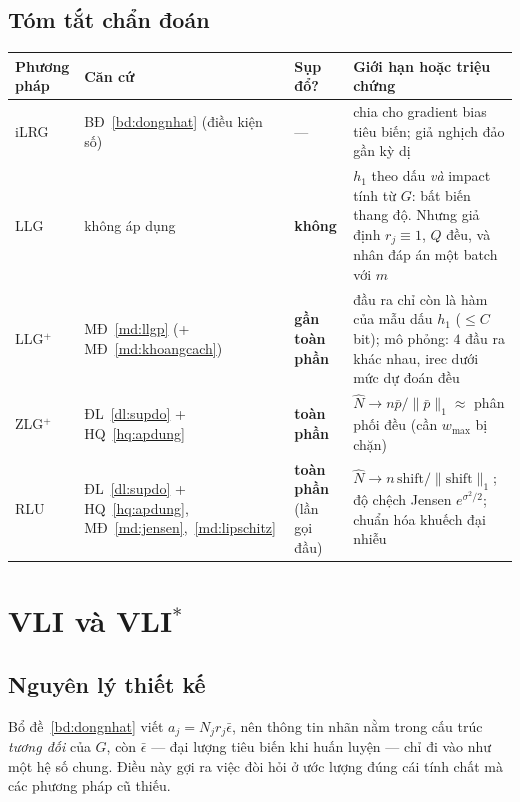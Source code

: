 \documentclass[11pt]{article}
\theoremstyle{remark}
\begin{document}
\subsection{Tóm tắt chẩn đoán}

\begin{center}
\footnotesize
\begin{tabular}{@{}lllp{6.0cm}@{}}
\toprule
Phương pháp & Căn cứ & Sụp đổ? & Giới hạn hoặc triệu chứng \\
\midrule
iLRG & BĐ~\ref{bd:dongnhat} (điều kiện số) & --- &
 chia cho gradient bias tiêu biến; giả nghịch đảo gần kỳ dị \\
LLG & không áp dụng & \textbf{không} &
 $h_1$ theo dấu \emph{và} impact tính từ $G$: bất biến thang độ. Nhưng giả
 định $r_j\equiv1$, $Q$ đều, và nhân đáp án một batch với $m$ \\
LLG$^+$ & MĐ~\ref{md:llgp} (+ MĐ~\ref{md:khoangcach}) & \textbf{gần toàn phần} &
 đầu ra chỉ còn là hàm của mẫu dấu $h_1$ ($\le C$ bit); mô phỏng: $4$ đầu ra
 khác nhau, irec dưới mức dự đoán đều \\
ZLG$^+$ & ĐL~\ref{dl:supdo} + HQ~\ref{hq:apdung} & \textbf{toàn phần} &
 $\widehat N \to n\bar p/\|\bar p\|_1 \approx$ phân phối đều (cần $w_{\max}$ bị chặn) \\
RLU & ĐL~\ref{dl:supdo} + HQ~\ref{hq:apdung}, MĐ~\ref{md:jensen},~\ref{md:lipschitz} & \textbf{toàn phần} (lần gọi đầu) &
 $\widehat N \to n\,\mathrm{shift}/\|\mathrm{shift}\|_1$; độ chệch Jensen
 $e^{\sigma^2/2}$; chuẩn hóa khuếch đại nhiễu \\
\bottomrule
\end{tabular}
\end{center}

\section{VLI và VLI$^*$}
\label{sec:vli}

\subsection{Nguyên lý thiết kế}

Bổ đề~\ref{bd:dongnhat} viết $a_j = N_j r_j \bar\epsilon$, nên thông tin nhãn
nằm trong cấu trúc \emph{tương đối} của $G$, còn $\bar\epsilon$ --- đại lượng
tiêu biến khi huấn luyện --- chỉ đi vào như một hệ số chung. Điều này gợi ra
việc đòi hỏi ở ước lượng đúng cái tính chất mà các phương pháp cũ thiếu.
\end{document}
